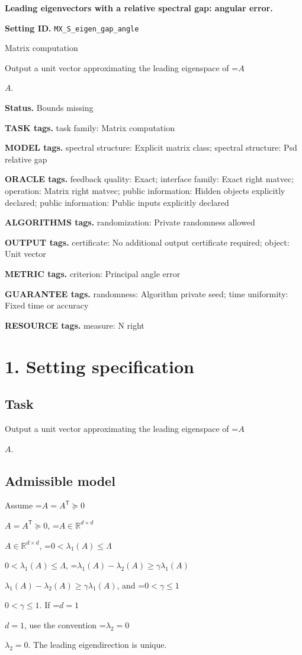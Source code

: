 \documentclass[10pt,a4paper]{article}
\newcommand{\AtlasMath}[1]{\par\begingroup\centering\setbox0=\hbox{$\displaystyle #1$}\ifdim\wd0>1.4\linewidth\typeout{ATLAS WIDE FORMULA: \the\wd0}\fi\ifdim\wd0>\linewidth\resizebox{\linewidth}{!}{\box0}\else\box0\fi\par\endgroup}
\newcommand{\AtlasInlineMath}[1]{\begingroup\setbox0=\hbox{$#1$}\ifdim\wd0>.4\linewidth\endgroup\AtlasMath{#1}\else\endgroup$#1$\fi}
\begin{document}
\raggedright

{\LARGE\bfseries\sffamily\color{AtlasNavy} Leading eigenvectors with a relative spectral gap: angular error.\par}\vspace{5pt}
\textbf{Setting ID.} \texttt{MX\_\allowbreak{}S\_\allowbreak{}eigen\_\allowbreak{}gap\_\allowbreak{}angle}

Matrix computation

Output a unit vector approximating the leading eigenspace of \AtlasInlineMath{A}.

\textbf{Status.} Bounds missing

\textbf{TASK tags.} task family: Matrix computation

\textbf{MODEL tags.} spectral structure: Explicit matrix class; spectral structure: Psd relative gap

\textbf{ORACLE tags.} feedback quality: Exact; interface family: Exact right matvec; operation: Matrix right matvec; public information: Hidden objects explicitly declared; public information: Public inputs explicitly declared

\textbf{ALGORITHMS tags.} randomization: Private randomness allowed

\textbf{OUTPUT tags.} certificate: No additional output certificate required; object: Unit vector

\textbf{METRIC tags.} criterion: Principal angle error

\textbf{GUARANTEE tags.} randomness: Algorithm private seed; time uniformity: Fixed time or accuracy

\textbf{RESOURCE tags.} measure: N right

\section{1. Setting specification}
\subsection{Task}
Output a unit vector approximating the leading eigenspace of \AtlasInlineMath{A}.

\subsection{Admissible model}
Assume \AtlasInlineMath{A=A^{\mathsf T}\succeq0}, \AtlasInlineMath{A\in\mathbb{R}^{d\times d}}, \AtlasInlineMath{0<\lambda_1(A)\le\Lambda}, \AtlasInlineMath{\lambda_1(A)-\lambda_2(A)\ge\gamma\lambda_1(A)}, and \AtlasInlineMath{0<\gamma\le1}. If \AtlasInlineMath{d=1}, use the convention \AtlasInlineMath{\lambda_2=0}. The leading eigendirection is unique.
\end{document}
